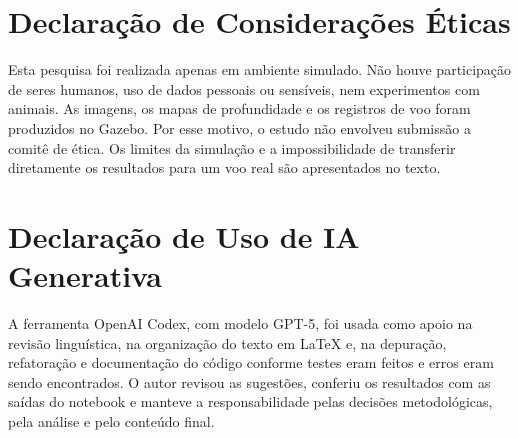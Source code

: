 \section*{Declaração de Considerações Éticas}
\thispagestyle{empty}

Esta pesquisa foi realizada apenas em ambiente simulado. Não houve participação de seres humanos, uso de dados pessoais ou sensíveis, nem experimentos com animais. As imagens, os mapas de profundidade e os registros de voo foram produzidos no Gazebo. Por esse motivo, o estudo não envolveu submissão a comitê de ética. Os limites da simulação e a impossibilidade de transferir diretamente os resultados para um voo real são apresentados no texto.

\section*{Declaração de Uso de IA Generativa}

A ferramenta OpenAI Codex, com modelo GPT-5, foi usada como apoio na revisão linguística, na organização do texto em LaTeX e, na depuração, refatoração e documentação do código conforme testes eram feitos e erros eram sendo encontrados. O autor revisou as sugestões, conferiu os resultados com as saídas do notebook e manteve a responsabilidade pelas decisões metodológicas, pela análise e pelo conteúdo final.

\clearpage
